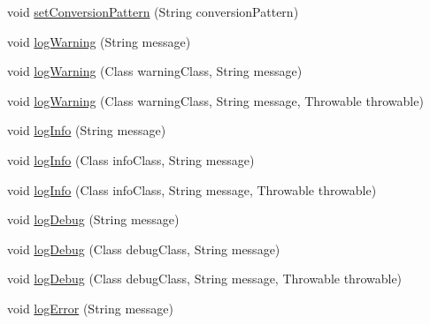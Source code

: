\begin{DoxyCompactItemize}
\item 
void \mbox{\hyperlink{classnet_1_1dlinkddns_1_1atulsaurabh_1_1hasselfreelogger_1_1impl_1_1_hassel_free_logger_a23a1e3b5c56528e197c7eb3832e7c69e}{set\+Conversion\+Pattern}} (String conversion\+Pattern)
\item 
void \mbox{\hyperlink{classnet_1_1dlinkddns_1_1atulsaurabh_1_1hasselfreelogger_1_1impl_1_1_hassel_free_logger_a9e847886284d6a0f7edef691e2d11efd}{log\+Warning}} (String message)
\item 
void \mbox{\hyperlink{classnet_1_1dlinkddns_1_1atulsaurabh_1_1hasselfreelogger_1_1impl_1_1_hassel_free_logger_ad5f8400bc0ea2500509a4154cfa48bf5}{log\+Warning}} (Class warning\+Class, String message)
\item 
void \mbox{\hyperlink{classnet_1_1dlinkddns_1_1atulsaurabh_1_1hasselfreelogger_1_1impl_1_1_hassel_free_logger_ac5e36ee2095f1f92c90885360a0fd1f1}{log\+Warning}} (Class warning\+Class, String message, Throwable throwable)
\item 
void \mbox{\hyperlink{classnet_1_1dlinkddns_1_1atulsaurabh_1_1hasselfreelogger_1_1impl_1_1_hassel_free_logger_abca8e8a8a8c85d582092b35fc395d726}{log\+Info}} (String message)
\item 
void \mbox{\hyperlink{classnet_1_1dlinkddns_1_1atulsaurabh_1_1hasselfreelogger_1_1impl_1_1_hassel_free_logger_a011e8791e13b815927a16254e9cfa2a3}{log\+Info}} (Class info\+Class, String message)
\item 
void \mbox{\hyperlink{classnet_1_1dlinkddns_1_1atulsaurabh_1_1hasselfreelogger_1_1impl_1_1_hassel_free_logger_ac0596a92805b29d9402a9eb17c71891a}{log\+Info}} (Class info\+Class, String message, Throwable throwable)
\item 
void \mbox{\hyperlink{classnet_1_1dlinkddns_1_1atulsaurabh_1_1hasselfreelogger_1_1impl_1_1_hassel_free_logger_a7aafa489bd14255cbdb43c1f2494d433}{log\+Debug}} (String message)
\item 
void \mbox{\hyperlink{classnet_1_1dlinkddns_1_1atulsaurabh_1_1hasselfreelogger_1_1impl_1_1_hassel_free_logger_a7c65f65791b715d7c72a2227a8a00bdc}{log\+Debug}} (Class debug\+Class, String message)
\item 
void \mbox{\hyperlink{classnet_1_1dlinkddns_1_1atulsaurabh_1_1hasselfreelogger_1_1impl_1_1_hassel_free_logger_a0995d59f7b5262af4be98f4e7ba21cd0}{log\+Debug}} (Class debug\+Class, String message, Throwable throwable)
\item 
void \mbox{\hyperlink{classnet_1_1dlinkddns_1_1atulsaurabh_1_1hasselfreelogger_1_1impl_1_1_hassel_free_logger_a94641af9c6c39ea601d5c41bf68a4b1f}{log\+Error}} (String message)

\end{DoxyCompactItemize}
